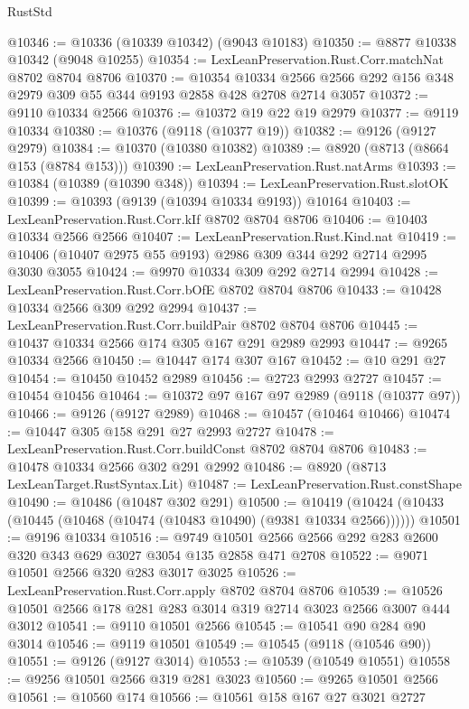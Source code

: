 \begin{lexlean}{RustStd}
\begin{coremodule}
@10346 := @10336 (@10339 @10342) (@9043 @10183)
@10350 := @8877 @10338 @10342 (@9048 @10255)
@10354 := LexLeanPreservation.Rust.Corr.matchNat @8702 @8704 @8706
@10370 := @10354
    @10334
    @2566
    @2566
    @292
    @156
    @348
    @2979
    @309
    @55
    @344
    @9193
    @2858
    @428
    @2708
    @2714
    @3057
@10372 := @9110 @10334 @2566
@10376 := @10372 @19 @22 @19 @2979
@10377 := @9119 @10334
@10380 := @10376 (@9118 (@10377 @19))
@10382 := @9126 (@9127 @2979)
@10384 := @10370 (@10380 @10382)
@10389 := @8920 (@8713 (@8664 @153 (@8784 @153)))
@10390 := LexLeanPreservation.Rust.natArms
@10393 := @10384 (@10389 (@10390 @348))
@10394 := LexLeanPreservation.Rust.slotOK
@10399 := @10393 (@9139 (@10394 @10334 @9193)) @10164
@10403 := LexLeanPreservation.Rust.Corr.kIf @8702 @8704 @8706
@10406 := @10403 @10334 @2566 @2566
@10407 := LexLeanPreservation.Rust.Kind.nat
@10419 := @10406 (@10407 @2975 @55 @9193) @2986 @309 @344 @292 @2714 @2995 @3030 @3055
@10424 := @9970 @10334 @309 @292 @2714 @2994
@10428 := LexLeanPreservation.Rust.Corr.bOfE @8702 @8704 @8706
@10433 := @10428 @10334 @2566 @309 @292 @2994
@10437 := LexLeanPreservation.Rust.Corr.buildPair @8702 @8704 @8706
@10445 := @10437 @10334 @2566 @174 @305 @167 @291 @2989 @2993
@10447 := @9265 @10334 @2566
@10450 := @10447 @174 @307 @167
@10452 := @10 @291 @27
@10454 := @10450 @10452 @2989
@10456 := @2723 @2993 @2727
@10457 := @10454 @10456
@10464 := @10372 @97 @167 @97 @2989 (@9118 (@10377 @97))
@10466 := @9126 (@9127 @2989)
@10468 := @10457 (@10464 @10466)
@10474 := @10447 @305 @158 @291 @27 @2993 @2727
@10478 := LexLeanPreservation.Rust.Corr.buildConst @8702 @8704 @8706
@10483 := @10478 @10334 @2566 @302 @291 @2992
@10486 := @8920 (@8713 LexLeanTarget.RustSyntax.Lit)
@10487 := LexLeanPreservation.Rust.constShape
@10490 := @10486 (@10487 @302 @291)
@10500 := @10419 (@10424 (@10433 (@10445 (@10468 (@10474 (@10483 @10490) (@9381 @10334 @2566))))))
@10501 := @9196 @10334
@10516 := @9749 @10501 @2566 @2566 @292 @283 @2600 @320 @343 @629 @3027 @3054 @135 @2858 @471 @2708
@10522 := @9071 @10501 @2566 @320 @283 @3017 @3025
@10526 := LexLeanPreservation.Rust.Corr.apply @8702 @8704 @8706
@10539 := @10526 @10501 @2566 @178 @281 @283 @3014 @319 @2714 @3023 @2566 @3007 @444 @3012
@10541 := @9110 @10501 @2566
@10545 := @10541 @90 @284 @90 @3014
@10546 := @9119 @10501
@10549 := @10545 (@9118 (@10546 @90))
@10551 := @9126 (@9127 @3014)
@10553 := @10539 (@10549 @10551)
@10558 := @9256 @10501 @2566 @319 @281 @3023
@10560 := @9265 @10501 @2566
@10561 := @10560 @174
@10566 := @10561 @158 @167 @27 @3021 @2727

\end{coremodule}
\end{lexlean}
